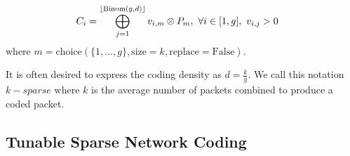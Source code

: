 \begin{align} \label{eq:sparse_coded_packet2}
    C_i  &= \bigoplus_{j=1}^{\lfloor\text{Binom}(g,d)\rfloor} v_{i,m} \otimes P_{m} ,\
    \forall i \in [1,g] ,\
    v_{i,j} > 0
\end{align}
where
$m = \text{choice}(\{1,\dots,g\}, \text{size}=k, \text{replace}=\text{False})$.


%

It is often desired to express the coding density as $d=\frac{k}{g}$. We call
this notation $k-sparse$ where $k$ is the average number of packets combined to
produce a coded packet.







%

\subsection{Tunable Sparse Network Coding}

